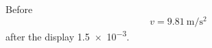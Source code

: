 \documentclass{article}
\begin{document}
Before
\[ v = \qty{9.81}{\metre\per\second\squared} \]
after the display \num{1.5e-3}.
\end{document}
